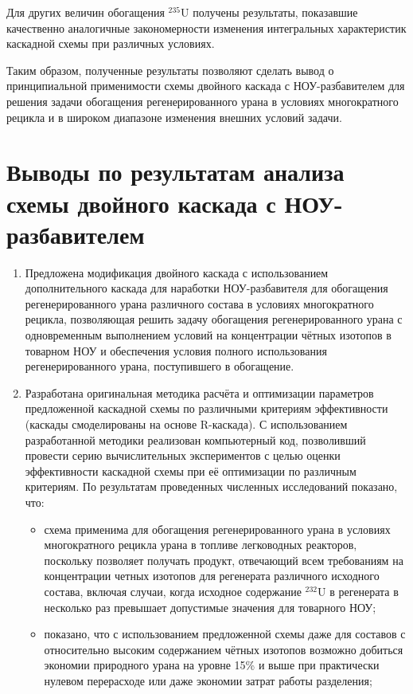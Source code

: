 Для других величин обогащения $^{235}$U получены результаты, показавшие качественно аналогичные закономерности изменения интегральных характеристик каскадной схемы при различных условиях. 

Таким образом, полученные результаты позволяют сделать вывод о принципиальной применимости схемы двойного каскада с НОУ-разбавителем для решения задачи обогащения регенерированного урана в условиях многократного рецикла и в широком диапазоне изменения внешних условий задачи.    


\section{Выводы по результатам анализа схемы двойного каскада с НОУ-разбавителем}

\begin{enumerate}
    \item Предложена модификация двойного каскада с использованием дополнительного каскада для наработки НОУ-разбавителя для обогащения регенерированного урана различного состава в условиях многократного рецикла, позволяющая решить задачу обогащения регенерированного урана с одновременным выполнением условий на концентрации чётных изотопов в товарном НОУ и обеспечения условия полного использования регенерированного урана, поступившего в обогащение.
    \item Разработана оригинальная методика расчёта и оптимизации параметров предложенной каскадной схемы по различными критериям эффективности (каскады смоделированы на основе R-каскада). С использованием разработанной методики реализован компьютерный код, позволивший провести серию вычислительных экспериментов с целью оценки эффективности каскадной схемы при её оптимизации по различным критериям. По результатам проведенных численных исследований показано, что:
    \begin{itemize}
    \item схема применима для обогащения регенерированного урана в условиях многократного рецикла урана в топливе легководных реакторов, поскольку позволяет получать продукт, отвечающий всем требованиям на концентрации четных изотопов для регенерата различного исходного состава, включая случаи, когда исходное содержание $^{232}$U в регенерата в несколько раз превышает допустимые значения для товарного НОУ;
    \item показано, что с использованием предложенной схемы даже для составов с относительно высоким содержанием чётных изотопов возможно добиться экономии природного урана на уровне 15\% и выше при практически нулевом перерасходе или даже экономии затрат работы разделения;

\end{itemize}
\end{enumerate}
